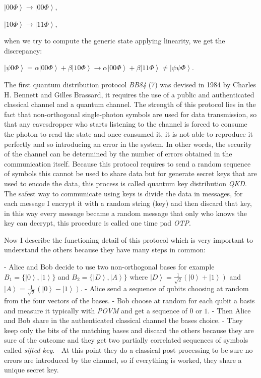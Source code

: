 $\left|0 0 \Phi\right> \to \left|0 0 \Phi\right>$,

$\left|1 0 \Phi\right> \to \left|1 1 \Phi\right>$,

when we try to compute the generic state applying linearity, we get the discrepancy:

$\left|\psi 0 \Phi\right> = \alpha\left|0 0 \Phi\right> + \beta\left|1 0 \Phi\right> \to \alpha\left|0 0 \Phi\right> + \beta\left|1 1 \Phi\right> \ne \left|\psi \psi \Phi\right>$.



The first quantum distribution protocol \textit{BB84} (7) was devised in 1984 by Charles H. Bennett and Gilles Brassard, it requires the use of a public and authenticated classical channel and a quantum channel. The strength of this protocol lies in the fact that non-orthogonal single-photon symbols are used for data transmission, so that any eavesdropper who starts listening to the channel is forced to consume the photon to read the state and once consumed it, it is not able to reproduce it perfectly and so introducing an error in the system. In other words, the security of the channel can be determined by the number of errors obtained in the communication itself.  Because this protocol requires to send a random sequence of symbols this cannot be used to share data but for generate secret keys that are used to encode the data, this process is called quantum key distribution \textit{QKD}. The safest way to communicate using keys is divide the data in messages, for each message I encrypt it with a random string (key) and then discard that key, in this way every message became a random message that only who knows the key can decrypt, this procedure is called one time pad \textit{OTP}.

Now I describe the functioning detail of this protocol which is very important to understand the others because they have many steps in common:

- Alice and Bob decide to use two non-orthogonal bases for example $B_1 = \{\left|0\right>, \left|1\right>\}$ and $B_2 = \{\left|D\right>, \left|A\right>\}$ where $\left|D\right> = \frac{1}{\sqrt{2}} (\left|0\right> + \left|1\right>)$ and $\left|A\right> = \frac{1}{\sqrt{2}} (\left|0\right> - \left|1\right>)$.
- Alice send a sequence of qubits choosing at random from the four vectors of the bases. 
- Bob choose at random for each qubit a basis and measure it typically with \textit{POVM} and get a sequence of $0$ or $1$.
- Then Alice and Bob share in the authenticated classical channel the bases choice.
- They keep only the bits of the matching bases and discard the others because they are sure of the outcome and they get two partially correlated sequences of symbols called \textit{sifted key}.
- At this point they do a classical post-processing to be sure no errors are introduced by the channel, so if everything is worked, they share a unique secret key.


